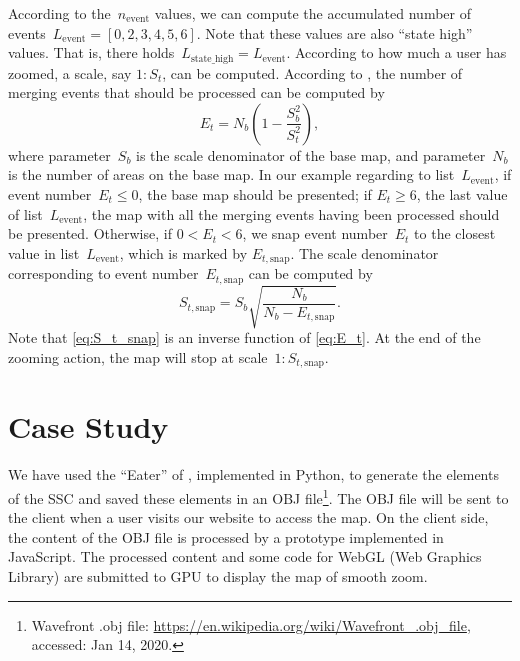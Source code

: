 \documentclass[ijgi,article,submit,moreauthors,pdftex]{Definitions/mdpi}
\begin{document}
According to the~$n_\mathrm{event}$ values,
we can compute the accumulated number of events~$L_\mathrm{event} = 
[0, 2, 3, 4, 5, 6]$.
Note that these values are also ``state high'' values.
That is, there holds~$L_\mathrm{state\_high} = L_\mathrm{event}$.
According to how much a user has zoomed,
a scale, say $1:S_t$, can be computed.
According to \citet{Huang2016Webmap},
the number of merging events that should be processed can be computed by
\begin{equation}
\label{eq:E_t}
E_t = N_b \left(1-\frac{S^2_b}{S^2_t}\right),
\end{equation}
where parameter~$S_b$ is the scale denominator of the base map,
and parameter~$N_b$ is the number of areas on the base map.
In our example regarding to list~$L_\mathrm{event}$,
if event number~$E_t \le 0$, the base map should be presented;
if $E_t \ge 6$, the last value of list~$L_\mathrm{event}$,
the map with all the merging events having been processed
should be presented.
Otherwise, if $0<E_t < 6$, we snap event number~$E_t$ 
to the closest value in list~$L_\mathrm{event}$,
which is marked by $E_{t,\mathrm{snap}}$.
The scale denominator corresponding to event number~$E_{t,\mathrm{snap}}$
can be computed by 
\begin{equation}
\label{eq:S_t_snap}
S_{t,\mathrm{snap}} = S_b \sqrt{\frac{N_b}{N_b-E_{t,\mathrm{snap}}}}.
\end{equation}
Note that \eq\ref{eq:S_t_snap} is an inverse function of \eq\ref{eq:E_t}.
At the end of the zooming action, 
the map will stop at scale~$1:S_{t,\mathrm{snap}}$.




\section{Case Study}
\label{sec:case_study}

We have used the ``Eater'' of \citet{Suba2014Merge},
implemented in Python, 
to generate the elements of the SSC \citep{vanOosterom2014tGAPSSC} 
and saved these elements in an OBJ file\footnote{%
Wavefront .obj file:
\url{https://en.wikipedia.org/wiki/Wavefront_.obj_file},
accessed: Jan 14, 2020.}.
%
The OBJ file will be sent to the client 
when a user visits our website to access the map.
On the client side,
the content of the OBJ file is processed
by a prototype implemented in JavaScript.
The processed content and some code for WebGL (Web Graphics Library)
are submitted to GPU to display the map of smooth zoom.
\end{document}
